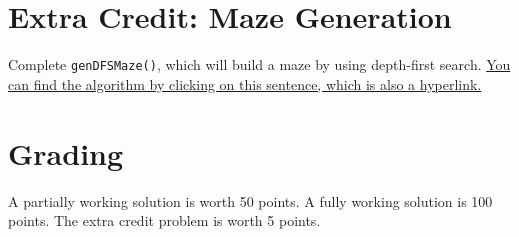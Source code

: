 \documentclass[10pt,letterpaper]{article}
\begin{document}
	
	
	
	\section{Extra Credit: Maze Generation}
	Complete \texttt{genDFSMaze()}, which will build a maze by using depth-first search.
	\href{https://en.wikipedia.org/wiki/Maze_generation_algorithm#Recursive_backtracker}{You can find the algorithm by clicking on this sentence, which is also a hyperlink.}
	
	
	\section{Grading}
	A partially working solution is worth 50 points.
	A fully working solution is 100 points.
	The extra credit problem is worth 5 points.
	
	
\end{document}
